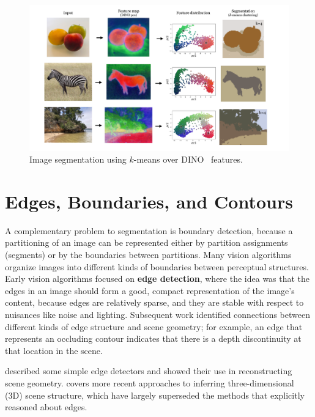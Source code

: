 
\begin{figure}[t]
    \centerline{
    \includegraphics[width=1.0\linewidth]{./figures/perceptual_organization/kmeans_dino.pdf}
    }
    \caption{Image segmentation using $k$-means over DINO~\cite{caron2021emerging} features.}
    \label{fig:perceptual_organization:kmeans_dino}
\end{figure}

\section{Edges, Boundaries, and Contours}
A complementary problem to segmentation is boundary detection, because a partitioning of an image can be represented either by partition assignments (segments) or by the boundaries between partitions. Many vision algorithms organize images into different kinds of boundaries between perceptual structures. Early vision algorithms focused on \textbf{edge detection}, where the idea was that the edges in an image should form a good, compact representation of the image's content, because edges are relatively sparse, and they are stable with respect to nuisances like noise and lighting. Subsequent work identified connections between different kinds of edge structure and scene geometry; for example, an edge that represents an occluding contour indicates that there is a depth discontinuity at that location in the scene.

\Chap{\ref{chapter:simplesystem}} described some simple edge detectors and showed their use in reconstructing scene geometry. \Chap{\ref{chapter:3D_single_view}} covers more recent approaches to inferring three-dimensional (3D) scene structure, which have largely superseded the methods that explicitly reasoned about edges.

